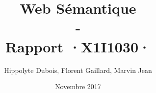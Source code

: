\documentclass{report}
\begin{document}

\title{Web Sémantique\\
        -\\
        \huge{Rapport}
        \vskip1cm
        ·X1I1030·
        }
\vskip2cm
\author{Hippolyte Dubois, Florent Gaillard, Marvin Jean}
\date{Novembre 2017}

%

\maketitle
\tableofcontents\begin{flushright}
\end{flushright}



\end{document}
